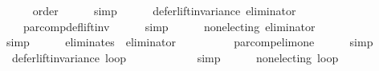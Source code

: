 \begin{isabellebody}
\ \ \ \ \isamarkupfalse%
\ order\isanewline
\ \ \ \ \isamarkupfalse%
\ simp\ \isanewline
\isanewline
\ \ \isamarkupfalse%
\ {}{}{\isacharcolon}{\kern0pt}\ {\isachardoublequoteopen}defer{\isacharunderscore}{\kern0pt}lift{\isacharunderscore}{\kern0pt}invariance\ {\isacharquery}{\kern0pt}eliminator{\isachardoublequoteclose}\isanewline
\ \ \ \ \isamarkupfalse%
\ {}{}{}\ {}{}{}\ {}{}{}\ par{\isacharunderscore}{\kern0pt}comp{\isacharunderscore}{\kern0pt}def{\isacharunderscore}{\kern0pt}lift{\isacharunderscore}{\kern0pt}inv\isanewline
\ \ \ \ \isamarkupfalse%
\ simp\ \isanewline
\ \ \isamarkupfalse%
\ {}{}{\isacharcolon}{\kern0pt}\ {\isachardoublequoteopen}non{\isacharunderscore}{\kern0pt}electing\ {\isacharquery}{\kern0pt}eliminator{\isachardoublequoteclose}\isanewline
\ \ \ \ \isamarkupfalse%
\ {}{}{}\ {}{}{}\ {}{}{}\isanewline
\ \ \ \ \isamarkupfalse%
\ simp\ \isanewline
\ \ \isamarkupfalse%
\ {}{}{\isacharcolon}{\kern0pt}\ {\isachardoublequoteopen}eliminates\ {}\ {\isacharquery}{\kern0pt}eliminator{\isachardoublequoteclose}\isanewline
\ \ \ \ \isamarkupfalse%
\ {}{}{}\ {}{}{}\ {}{}{}\ {}{}{}\ par{\isacharunderscore}{\kern0pt}comp{\isacharunderscore}{\kern0pt}elim{\isacharunderscore}{\kern0pt}one\isanewline
\ \ \ \ \isamarkupfalse%
\ simp\isanewline
\isanewline
\ \ \isamarkupfalse%
\ {}{\isacharcolon}{\kern0pt}\ {\isachardoublequoteopen}defer{\isacharunderscore}{\kern0pt}lift{\isacharunderscore}{\kern0pt}invariance\ {\isacharquery}{\kern0pt}loop{\isachardoublequoteclose}\isanewline
\ \ \ \ \isamarkupfalse%
\ {}{}\isanewline
\ \ \ \ \isamarkupfalse%
\ simp\ \isanewline
\ \ \isamarkupfalse%
\ {}{\isacharcolon}{\kern0pt}\ {\isachardoublequoteopen}non{\isacharunderscore}{\kern0pt}electing\ {\isacharquery}{\kern0pt}loop{\isachardoublequoteclose}\isanewline
\ \ \ \ \isamarkupfalse%
\ {}{}\isanewline

\end{isabellebody}
